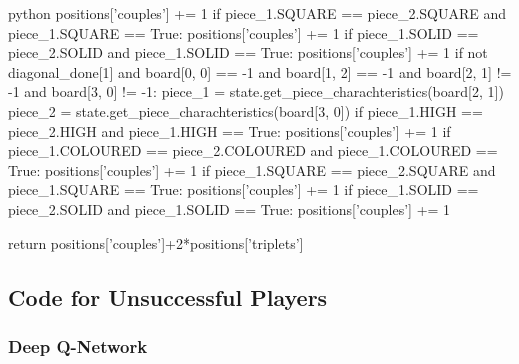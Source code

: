 \begin{mintedbox}{python}
            positions['couples'] += 1
        if piece_1.SQUARE == piece_2.SQUARE and piece_1.SQUARE == True:
            positions['couples'] += 1
        if piece_1.SOLID == piece_2.SOLID and piece_1.SOLID == True:
            positions['couples'] += 1
    if not diagonal_done[1] and board[0, 0] == -1 and board[1, 2] == -1 and board[2, 1] != -1 and board[3, 0] != -1:
        piece_1 = state.get_piece_charachteristics(board[2, 1])
        piece_2 = state.get_piece_charachteristics(board[3, 0])
        if piece_1.HIGH == piece_2.HIGH and piece_1.HIGH == True:
            positions['couples'] += 1
        if piece_1.COLOURED == piece_2.COLOURED and piece_1.COLOURED == True:
            positions['couples'] += 1
        if piece_1.SQUARE == piece_2.SQUARE and piece_1.SQUARE == True:
            positions['couples'] += 1
        if piece_1.SOLID == piece_2.SOLID and piece_1.SOLID == True:
            positions['couples'] += 1

    return positions['couples']+2*positions['triplets']

\end{mintedbox}

\subsection{Code for Unsuccessful Players}

\subsubsection{Deep Q-Network}

